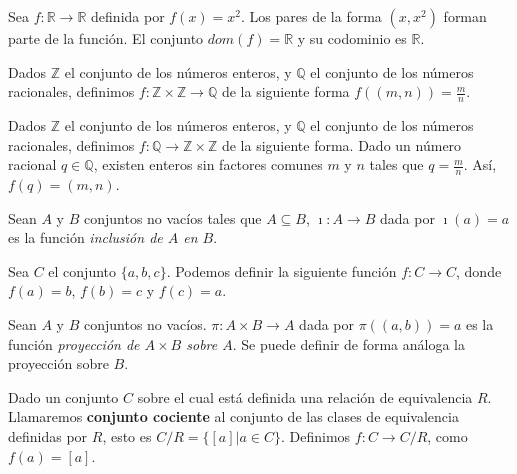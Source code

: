\documentclass[12pt,]{krantz}
\theoremstyle{definition}
\theoremstyle{definition}
\theoremstyle{definition}
\theoremstyle{remark}
\let\BeginKnitrBlock\begin \let\EndKnitrBlock\end
\begin{document}
\BeginKnitrBlock{example}
\protect\hypertarget{exm:ejm1-12}{}{\label{exm:ejm1-12} }Sea
\(f: \mathbb{R}\longrightarrow\mathbb{R}\) definida por \(f(x)=x^{2}\).
Los pares de la forma \((x,x^{2})\) forman parte de la función. El
conjunto \(dom(f)=\mathbb{R}\) y su codominio es \(\mathbb{R}\).
\EndKnitrBlock{example}

\BeginKnitrBlock{example}
\protect\hypertarget{exm:ejm1-13}{}{\label{exm:ejm1-13} }Dados
\(\mathbb{Z}\) el conjunto de los números enteros, y \(\mathbb{Q}\) el
conjunto de los números racionales, definimos
\(f:\mathbb{Z}\times\mathbb{Z}\longrightarrow\mathbb{Q}\) de la
siguiente forma \(f((m,n))=\frac{m}{n}\).
\EndKnitrBlock{example}

\BeginKnitrBlock{example}
\protect\hypertarget{exm:ejm1-14}{}{\label{exm:ejm1-14} }Dados
\(\mathbb{Z}\) el conjunto de los números enteros, y \(\mathbb{Q}\) el
conjunto de los números racionales, definimos
\(f:\mathbb{Q}\longrightarrow \mathbb{Z}\times\mathbb{Z}\) de la
siguiente forma. Dado un número racional \(q\in\mathbb{Q}\), existen
enteros sin factores comunes \(m\) y \(n\) tales que \(q=\frac{m}{n}\).
Así, \(f(q)=(m,n)\).
\EndKnitrBlock{example}

\BeginKnitrBlock{example}
\protect\hypertarget{exm:ejm1-15}{}{\label{exm:ejm1-15} }Sean \(A\) y \(B\)
conjuntos no vacíos tales que \(A\subseteq B\),
\(\imath: A \longrightarrow B\) dada por \(\imath(a)=a\) es la función
\textit{inclusión de $A$ en $B$}.
\EndKnitrBlock{example}

\BeginKnitrBlock{example}
\protect\hypertarget{exm:ejm1-16}{}{\label{exm:ejm1-16} }Sea \(C\) el
conjunto \(\{a,b,c\}\). Podemos definir la siguiente función
\(f:C\longrightarrow C\), donde \(f(a)=b\), \(f(b)=c\) y \(f(c)=a\).
\EndKnitrBlock{example}

\BeginKnitrBlock{example}
\protect\hypertarget{exm:ejm1-17}{}{\label{exm:ejm1-17} }Sean \(A\) y \(B\)
conjuntos no vacíos. \(\pi: A\times B\longrightarrow A\) dada por
\(\pi((a,b))=a\) es la función
\textit{proyección de $A\times B$ sobre $A$}. Se puede definir de forma
análoga la proyección sobre \(B\).
\EndKnitrBlock{example}

\BeginKnitrBlock{example}
\protect\hypertarget{exm:ejm1-18}{}{\label{exm:ejm1-18} }Dado un conjunto
\(C\) sobre el cual está definida una relación de equivalencia \(R\).
Llamaremos \textbf{conjunto cociente} al conjunto de las clases de
equivalencia definidas por \(R\), esto es \(C/R=\{[a] | a\in C \}\).
Definimos \(f:C\longrightarrow C/R\), como \(f(a)=[a]\).
\EndKnitrBlock{example}
\end{document}
